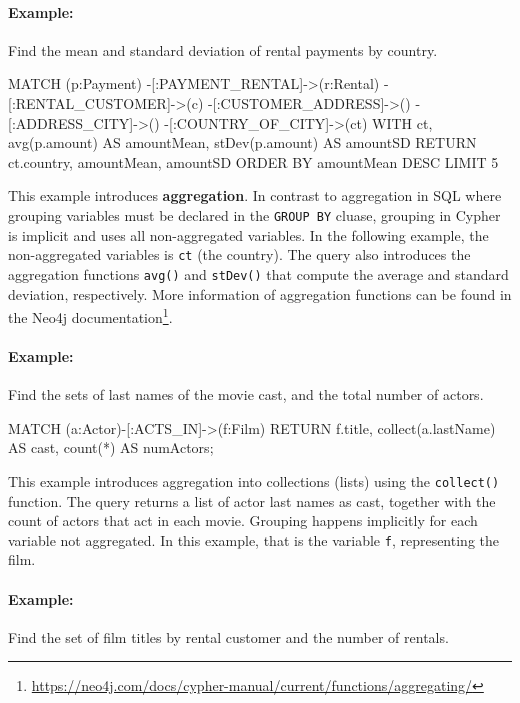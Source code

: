 \begin{withcode}
\paragraph*{Example:} Find the mean and standard deviation of rental payments by country.

\begin{cyphercode}
MATCH (p:Payment) 
        -[:PAYMENT_RENTAL]->(r:Rental) 
        -[:RENTAL_CUSTOMER]->(c) 
        -[:CUSTOMER_ADDRESS]->() 
        -[:ADDRESS_CITY]->()
        -[:COUNTRY_OF_CITY]->(ct)
WITH ct, 
     avg(p.amount) AS amountMean, 
     stDev(p.amount) AS amountSD
RETURN ct.country, amountMean, amountSD
ORDER BY amountMean DESC LIMIT 5
\end{cyphercode}

This example introduces \textbf{aggregation}. In contrast to aggregation in SQL where grouping variables must be declared in the \texttt{GROUP BY} cluase, grouping in Cypher is implicit and uses all non-aggregated variables. In the following example, the non-aggregated variables is \texttt{ct} (the country). The query also introduces the aggregation functions \texttt{avg()} and \texttt{stDev()} that compute the average and standard deviation, respectively. More information of aggregation functions can be found in the Neo4j documentation\footnote{\url{https://neo4j.com/docs/cypher-manual/current/functions/aggregating/}}.

\paragraph*{Example:} Find the sets of last names of the movie cast, and the total number of actors.

\begin{cyphercode}
MATCH (a:Actor)-[:ACTS_IN]->(f:Film) 
RETURN f.title, 
       collect(a.lastName) AS cast, 
       count(*) AS numActors;
\end{cyphercode}

This example introduces aggregation into collections (lists) using the \texttt{collect()} function. The query returns a list of actor last names as cast, together with the count of actors that act in each movie. Grouping happens implicitly for each variable not aggregated. In this example, that is the variable \texttt{f}, representing the film.

\paragraph*{Example:} Find the set of film titles by rental customer and the number of rentals.


\end{withcode}
